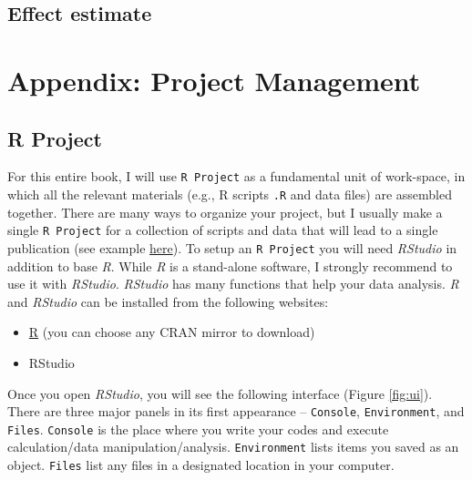 \documentclass[
]{book}
\providecommand{\tightlist}{%
  \setlength{\itemsep}{0pt}\setlength{\parskip}{0pt}}
\begin{document}
\hypertarget{effect-estimate}{%
\section{Effect estimate}\label{effect-estimate}}

\hypertarget{section}{%
\subsection{}\label{section}}

\hypertarget{appendix-project-management}{%
\chapter{Appendix: Project Management}\label{appendix-project-management}}

\hypertarget{r-project}{%
\section{R Project}\label{r-project}}

For this entire book, I will use \texttt{R\ Project} as a fundamental unit of work-space, in which all the relevant materials (e.g., R scripts \texttt{.R} and data files) are assembled together. There are many ways to organize your project, but I usually make a single \texttt{R\ Project} for a collection of scripts and data that will lead to a single publication (see example \href{https://github.com/aterui/public-proj_stream-diversity}{here}). To setup an \texttt{R\ Project} you will need \emph{RStudio} in addition to base \emph{R}. While \emph{R} is a stand-alone software, I strongly recommend to use it with \emph{RStudio}. \emph{RStudio} has many functions that help your data analysis. \emph{R} and \emph{RStudio} can be installed from the following websites:

\begin{itemize}
\tightlist
\item
  \href{https://www.r-project.org/}{R} (you can choose any CRAN mirror to download)
\item
  RStudio
\end{itemize}

Once you open \emph{RStudio}, you will see the following interface (Figure \ref{fig:ui}). There are three major panels in its first appearance -- \texttt{Console}, \texttt{Environment}, and \texttt{Files}. \texttt{Console} is the place where you write your codes and execute calculation/data manipulation/analysis. \texttt{Environment} lists items you saved as an object. \texttt{Files} list any files in a designated location in your computer.
\end{document}
